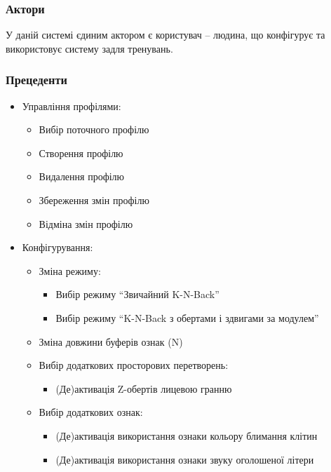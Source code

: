 \subsubsection{Актори}
У даній системі єдиним актором є користувач -- людина, що конфігурує та використовує систему задля тренувань.

\subsubsection{Прецеденти}

\begin{itemize}
  \item Управління профілями:
    \begin{itemize}[leftmargin=24pt]
      \item Вибір поточного профілю
      \item Створення профілю
      \item Видалення профілю
      \item Збереження змін профілю
      \item Відміна змін профілю
    \end{itemize}
  \item Конфігурування:
    \begin{itemize}[leftmargin=24pt]
      \item Зміна режиму:
        \begin{itemize}[leftmargin=24pt]
          \item Вибір режиму ``Звичайний K-N-Back''
          \item Вибір режиму ``K-N-Back з обертами і здвигами за модулем''
        \end{itemize}
      \item Зміна довжини буферів ознак (N)
      \item Вибір додаткових просторових перетворень:
        \begin{itemize}[leftmargin=24pt]
          \item (Де)активація Z-обертів лицевою гранню
        \end{itemize}
      \item Вибір додаткових ознак:
        \begin{itemize}[leftmargin=24pt]
          \item (Де)активація використання ознаки кольору блимання клітин
          \item (Де)активація використання ознаки звуку оголошеної літери
        \end{itemize}

\end{itemize}
\end{itemize}
